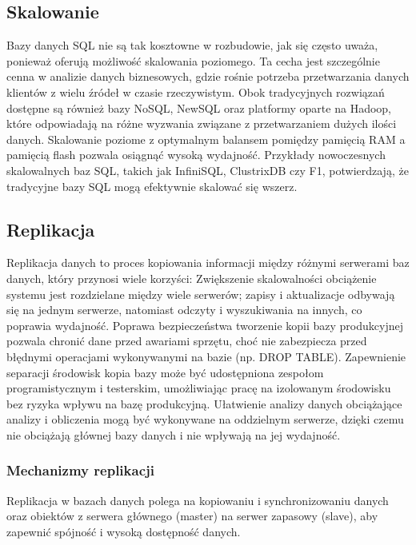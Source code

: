 \documentclass[a4paper,11pt,openany,english]{sphinxmanual}
\begin{document}
\subsection{Skalowanie}
\label{\detokenize{rozdzial2/Wydajnosc-Skalowanie-i-Replikacja/index:skalowanie}}
\sphinxAtStartPar
Bazy danych SQL nie są tak kosztowne w rozbudowie, jak się często uważa, ponieważ oferują możliwość skalowania poziomego. Ta cecha jest szczególnie cenna w analizie danych biznesowych, gdzie rośnie potrzeba przetwarzania danych klientów z wielu źródeł w czasie rzeczywistym. Obok tradycyjnych rozwiązań dostępne są również bazy NoSQL, NewSQL oraz platformy oparte na Hadoop, które odpowiadają na różne wyzwania związane z przetwarzaniem dużych ilości danych. Skalowanie poziome z optymalnym balansem pomiędzy pamięcią RAM a pamięcią flash pozwala osiągnąć wysoką wydajność. Przykłady nowoczesnych skalowalnych baz SQL, takich jak InfiniSQL, ClustrixDB czy F1, potwierdzają, że tradycyjne bazy SQL mogą efektywnie skalować się wszerz.


\subsection{Replikacja}
\label{\detokenize{rozdzial2/Wydajnosc-Skalowanie-i-Replikacja/index:replikacja}}
\sphinxAtStartPar
Replikacja danych to proces kopiowania informacji między różnymi serwerami baz danych, który przynosi wiele korzyści:
\sphinxhyphen{} Zwiększenie skalowalności \textendash{} obciążenie systemu jest rozdzielane między wiele serwerów; zapisy i aktualizacje odbywają się na jednym serwerze, natomiast odczyty i wyszukiwania na innych, co poprawia wydajność.
\sphinxhyphen{} Poprawa bezpieczeństwa \textendash{} tworzenie kopii bazy produkcyjnej pozwala chronić dane przed awariami sprzętu, choć nie zabezpiecza przed błędnymi operacjami wykonywanymi na bazie (np. DROP TABLE).
\sphinxhyphen{} Zapewnienie separacji środowisk \textendash{} kopia bazy może być udostępniona zespołom programistycznym i testerskim, umożliwiając pracę na izolowanym środowisku bez ryzyka wpływu na bazę produkcyjną.
\sphinxhyphen{} Ułatwienie analizy danych \textendash{} obciążające analizy i obliczenia mogą być wykonywane na oddzielnym serwerze, dzięki czemu nie obciążają głównej bazy danych i nie wpływają na jej wydajność.


\subsubsection{Mechanizmy replikacji}
\label{\detokenize{rozdzial2/Wydajnosc-Skalowanie-i-Replikacja/index:mechanizmy-replikacji}}
\sphinxAtStartPar
Replikacja w bazach danych polega na kopiowaniu i synchronizowaniu danych oraz obiektów z serwera głównego (master) na serwer zapasowy (slave), aby zapewnić spójność i wysoką dostępność danych.
\end{document}
